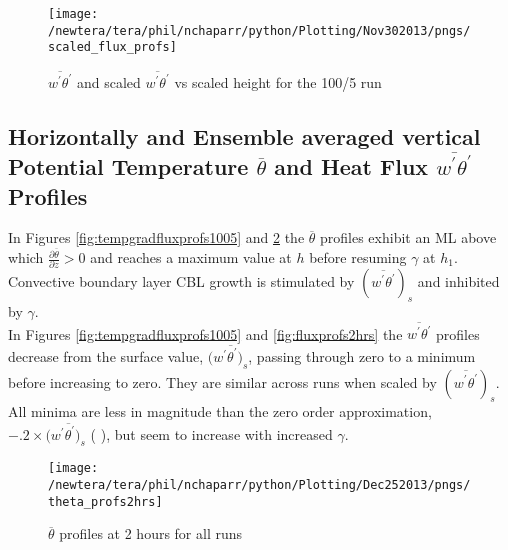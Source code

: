 \begin{figure}[htbp]
    \centering
    \texttt{[image: /newtera/tera/phil/nchaparr/python/Plotting/Nov302013/pngs/scaled\_flux\_profs]}
    \caption[$\overline{w^{'}\theta^{'}}$ scaled by $(\overline{w^{'}\theta^{'}})_{s}$]{$\overline{w^{'}\theta^{'}}$ and scaled $\overline{w^{'}\theta^{'}}$  vs scaled height for the 100/5 run}
    \label{fig:scaledfluxprofs15010}   %
\end{figure}

\clearpage

\subsection{Horizontally and Ensemble averaged vertical Potential Temperature $\overline{\theta}$ 
and Heat Flux $\overline{w^{'}\theta^{'}}$ Profiles}
\FloatBarrier

In Figures \ref{fig:tempgradfluxprofs1005} and \ref{fig:pottempprofs2hrs} the $\overline{\theta}$ profiles exhibit an \acs{ML} above which  $\frac{\partial\overline{\theta}}{\partial z}>0$ 
and reaches a maximum value at $h$ before resuming $\gamma$  at $h_{1}$.  Convective boundary layer \acs{CBL} growth is stimulated by $(\overline{w^{'}\theta^{'}})_{s}$ and inhibited by $\gamma$.\\

In Figures \ref{fig:tempgradfluxprofs1005} and  \ref{fig:fluxprofs2hrs} the $\overline{w^{'}\theta^{'}}$ profiles decrease from the surface value, $(\overline{w^{'}\theta^{'})_{s}}$, passing through zero to a minimum before increasing to zero.  They are similar across runs when scaled by $(\overline{w^{'}\theta^{'}})_{s}$. All minima are less  in magnitude than the zero order approximation, $-.2 \times (\overline{w^{'}\theta^{'})_{s}}$ (\citeauthor{Tennekes73} \citeyear{Tennekes73}), but seem to increase with increased $\gamma$.\\


\begin{figure}[htbp]
    \centering
    \texttt{[image: /newtera/tera/phil/nchaparr/python/Plotting/Dec252013/pngs/theta\_profs2hrs]}
    \caption{$\overline{\theta}$ profiles at 2 hours for all runs}
    \label{fig:pottempprofs2hrs}   %
\end{figure}

